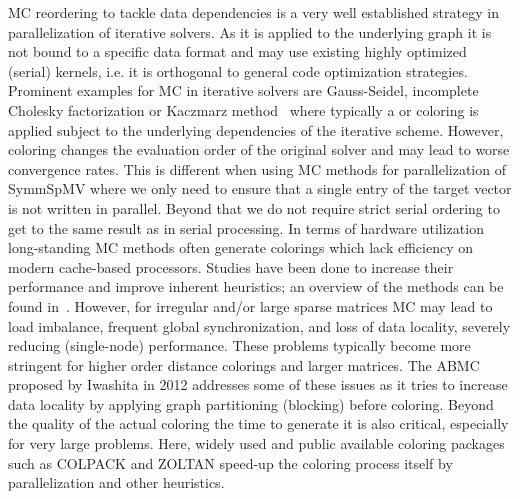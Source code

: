 \Acrfull{MC} reordering to tackle data dependencies is a very well established strategy in parallelization of iterative solvers. As it is applied to the underlying graph it is not bound to a specific data format and may use existing highly optimized (serial) kernels, i.e. it is orthogonal to general code optimization strategies.  
Prominent examples for  \acrshort{MC} in iterative solvers are Gauss-Seidel, incomplete 
Cholesky factorization or Kaczmarz method~\cite{RBGS,MC,feast_mc} where typically a \DONE or \DTWO coloring is applied subject to the underlying dependencies of the iterative scheme. However, coloring changes the evaluation order of the original solver and may lead to worse convergence rates. This is different when using  \acrshort{MC} methods for parallelization of \acrshort{SymmSpMV} where we only need to ensure that a single entry of the target vector is not written in parallel. Beyond that we do not  require strict serial ordering to get to the same result as in serial processing.
In terms of hardware utilization long-standing \acrshort{MC} methods often generate colorings which lack efficiency on modern cache-based
processors. Studies have been done to increase their
performance and improve inherent heuristics; an overview of the methods can be found
in~\cite{dist_k_def,COLPACK,equitable_color}. However, 
for irregular and/or large sparse 
matrices \acrshort{MC} may lead to load imbalance, frequent global synchronization, 
and loss of data locality, severely reducing (single-node) performance. 
These problems typically become more stringent for higher order distance
colorings and larger matrices.
The \acrfull{ABMC}~\cite{ABMC} proposed by Iwashita \etal in 2012 addresses some of these issues as it tries to increase data locality by applying graph partitioning (blocking) before coloring. 
Beyond the quality of the actual coloring the time to generate it is also critical, especially for very large problems. Here, widely used and public available coloring packages such as COLPACK\cite{COLPACK} and ZOLTAN\cite{BOZDAG2008515,doi:10.1137/080732158} speed-up the coloring process itself by parallelization and other heuristics. 

